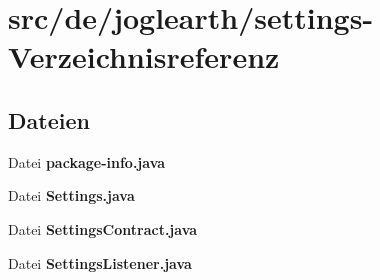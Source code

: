 \section{src/de/joglearth/settings-\/\-Verzeichnisreferenz}
\label{dir_0669f8f482865f73858502e9002bc39c}
\subsection*{Dateien}
\begin{DoxyCompactItemize}
\item 
Datei {\bfseries package-\/info.\-java}
\item 
Datei {\bfseries Settings.\-java}
\item 
Datei {\bfseries Settings\-Contract.\-java}
\item 
Datei {\bfseries Settings\-Listener.\-java}
\end{DoxyCompactItemize}
